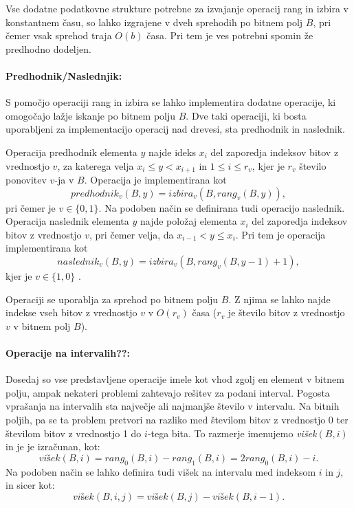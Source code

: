 Vse dodatne podatkovne strukture potrebne za izvajanje operacij rang in izbira v konstantnem času, so lahko izgrajene v dveh sprehodih po bitnem polj $B$, pri čemer vsak sprehod traja $O(b)$ časa. Pri tem je ves potrebni spomin že predhodno dodeljen.

\paragraph{Predhodnik/Naslednjik:}
S pomočjo operaciji rang in izbira se lahko implementira dodatne operacije, ki omogočajo lažje iskanje po bitnem polju $B$. Dve taki operaciji, ki bosta uporabljeni za implementacijo operacij nad drevesi, sta predhodnik in naslednik.

Operacija predhodnik elementa $y$ najde ideks $x_i$ del zaporedja indeksov bitov z vrednostjo $v$, za katerega velja $x_i \le y < x_{i+1}$ in $1\le i\le r_v$, kjer je $r_v$ število ponovitev $v$-ja v $B$. Operacija je implementirana kot
    $$predhodnik_v(B,y)=izbira_v(B,rang_v(B,y)),$$
pri čemer je $v\in \{0,1\}$. Na podoben način se definirana tudi operacijo naslednik. Operacija naslednik elementa $y$ najde položaj elementa $x_i$ del zaporedja indeksov bitov z vrednostjo $v$, pri čemer velja, da $x_{i-1}< y \le x_i$. Pri tem je operacija implementirana kot
    $$naslednik_v(B,y)=izbira_v(B,rang_v(B,y-1)+1),$$
kjer je  $v\in \{1,0\}$ \cite{Navarro2016}.

Operaciji se uporablja za sprehod po bitnem polju $B$. Z njima se lahko najde indekse vseh bitov z vrednostjo $v$ v $O(r_v)$ časa ($r_v$ je število bitov z vrednostjo $v$ v bitnem polj $B$).

\paragraph{Operacije na intervalih??:}
Dosedaj so vse predstavljene operacije imele kot vhod zgolj en element v bitnem polju, ampak nekateri problemi zahtevajo rešitev za podani interval. Pogosta vprašanja na intervalih sta največje ali najmanjše število v intervalu. Na bitnih poljih, pa se ta problem pretvori na razliko med številom bitov z vrednostjo 0 ter številom bitov z vrednostjo 1 do $i$-tega bita. To razmerje imenujemo \textit{višek}$(B,i)$ in je je izračunan, kot:
$$
    \textit{višek}(B,i)=rang_0(B,i)-rang_1(B,i)=2rang_0(B,i)-i.
$$
Na podoben način se lahko definira tudi višek na intervalu med indeksom $i$ in $j$, in sicer kot:
$$
    \textit{višek}(B,i,j)=\textit{višek}(B,j)-\textit{višek}(B,i-1).
$$

